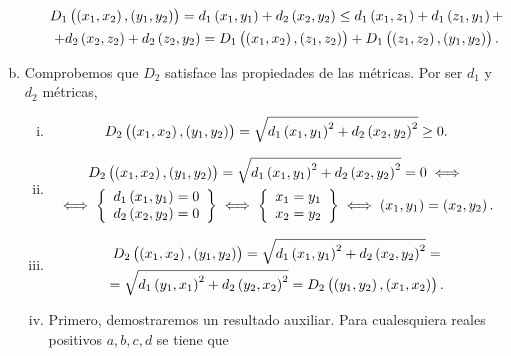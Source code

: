 \begin{ej}
\begin{enumerate}[(a)]
\begin{enumerate}[i)]
\begin{gather*}
                D_1 \left( \left( x_1, x_2 \right) , \left( y_1 , y_2 \right) \right) = d_1 \left( x_1, y_1 \right) + d_2 \left( x_2 , y_2 \right) \leq d_1 \left( x_1, z_1 \right) + d_1 \left( z_1, y_1 \right) + \\
                + d_2 \left( x_2, z_2 \right) + d_2 \left( z_2, y_2 \right) = D_1 \left( \left( x_1, x_2 \right) , \left( z_1 , z_2 \right) \right) + D_1 \left( \left( z_1, z_2 \right) , \left( y_1 , y_2 \right) \right).
            \end{gather*}
		\end{enumerate}
		\item Comprobemos que $D_2$ satisface las propiedades de las métricas. Por ser $d_1$ y $d_2$ métricas,
		\begin{enumerate}[i)]
            \item
            \[
                D_2 \left( \left( x_1, x_2 \right) , \left( y_1 , y_2 \right) \right) = \sqrt{ d_1 \left( x_1, y_1\right) ^2 + d_2 \left( x_2 , y_2 \right)^2 } \geq 0.
            \]
            \item 
            \begin{gather*}
                D_2 \left( \left( x_1, x_2 \right) , \left( y_1 , y_2 \right) \right) = \sqrt{ d_1 \left( x_1, y_1\right) ^2 + d_2 \left( x_2 , y_2 \right)^2 } = 0 \iff \\
                \iff \left\{ \begin{array}{c}
                    d_1 \left( x_1, y_1 \right) = 0 \\
                    d_2 \left( x_2, y_2 \right) = 0
                \end{array} \right\} \iff  \left\{ \begin{array}{c}
                    x_1=y_1 \\
                    x_2=y_2
                \end{array} \right\} \iff \left( x_1, y_1 \right) = \left( x_2, y_2 \right).
            \end{gather*}
            \item 
            \begin{gather*}
                D_2 \left( \left( x_1, x_2 \right) , \left( y_1 , y_2 \right) \right) = \sqrt{ d_1 \left( x_1, y_1\right) ^2 + d_2 \left( x_2 , y_2 \right)^2 } = \\ 
                = \sqrt{ d_1 \left( y_1, x_1\right) ^2 + d_2 \left( y_2 , x_2 \right)^2 } = D_2 \left( \left( y_1, y_2 \right) , \left( x_1 , x_2 \right) \right) .
            \end{gather*}
            \item Primero, demostraremos un resultado auxiliar. Para cualesquiera reales positivos $a, b, c, d$ se tiene que
            \begin{gather}\label{ej.11.a.lema}  \nonumber

\end{gather}
\end{enumerate}
\end{enumerate}
\end{ej}
